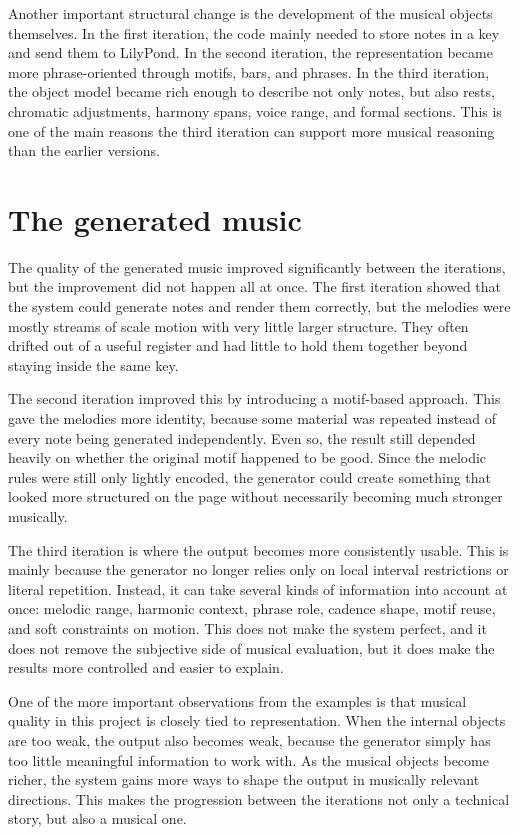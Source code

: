   Another important structural change is the development of the musical objects themselves. In the first iteration, the code mainly needed to store notes in a key and send them to LilyPond. In the second iteration, the representation became more phrase-oriented through motifs, bars, and phrases. In the third iteration, the object model became rich enough to describe not only notes, but also rests, chromatic adjustments, harmony spans, voice range, and formal sections. This is one of the main reasons the third iteration can support more musical reasoning than the earlier versions.

\section{The generated music}
  The quality of the generated music improved significantly between the iterations, but the improvement did not happen all at once. The first iteration showed that the system could generate notes and render them correctly, but the melodies were mostly streams of scale motion with very little larger structure. They often drifted out of a useful register and had little to hold them together beyond staying inside the same key.

  The second iteration improved this by introducing a motif-based approach. This gave the melodies more identity, because some material was repeated instead of every note being generated independently. Even so, the result still depended heavily on whether the original motif happened to be good. Since the melodic rules were still only lightly encoded, the generator could create something that looked more structured on the page without necessarily becoming much stronger musically.

  The third iteration is where the output becomes more consistently usable. This is mainly because the generator no longer relies only on local interval restrictions or literal repetition. Instead, it can take several kinds of information into account at once: melodic range, harmonic context, phrase role, cadence shape, motif reuse, and soft constraints on motion. This does not make the system perfect, and it does not remove the subjective side of musical evaluation, but it does make the results more controlled and easier to explain.

  One of the more important observations from the examples is that musical quality in this project is closely tied to representation. When the internal objects are too weak, the output also becomes weak, because the generator simply has too little meaningful information to work with. As the musical objects become richer, the system gains more ways to shape the output in musically relevant directions. This makes the progression between the iterations not only a technical story, but also a musical one.

